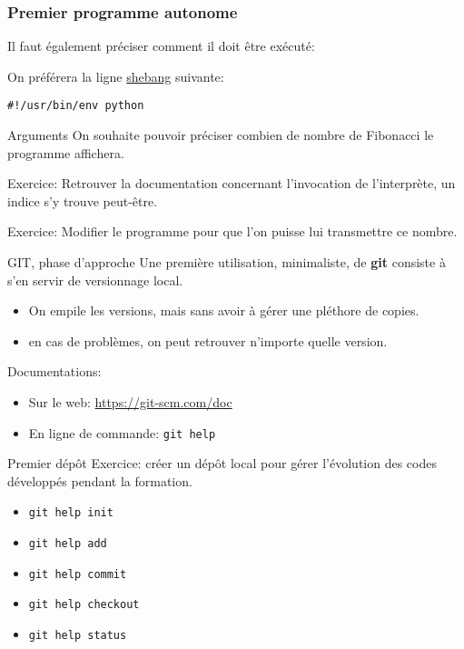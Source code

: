 \documentclass{beamer}
\begin{document}
\begin{frame}[fragile]\frametitle{Premier programme autonome}
  Il faut également préciser comment il doit être exécuté:
  \fbox{}

  On préférera la ligne \href{https://en.wikipedia.org/wiki/Shebang_(Unix)}{shebang} suivante:
\begin{verbatim}
#!/usr/bin/env python
\end{verbatim}
\end{frame}

\begin{frame}{Arguments}
  On souhaite pouvoir préciser combien de nombre de Fibonacci le programme affichera.

  Exercice: Retrouver la documentation concernant l'invocation de l'interprète, un indice s'y trouve peut-être.
  
  Exercice: Modifier le programme pour que l'on puisse lui transmettre ce nombre. 
\end{frame}

\begin{frame}{GIT, phase d'approche}
  Une première utilisation, minimaliste, de {\bf git} consiste à s'en servir de versionnage local.
  \begin{itemize}
  \item On empile les versions, mais sans avoir à gérer une pléthore de copies.
  \item en cas de problèmes, on peut retrouver n'importe quelle version.
  \end{itemize}
  Documentations:
  \begin{itemize}
  \item Sur le web: \url{https://git-scm.com/doc}
  \item En ligne de commande: {\tt git help}
  \end{itemize}
\end{frame}

\begin{frame}{Premier dépôt}
  Exercice: créer un dépôt local pour gérer l'évolution des codes développés pendant la formation.
  \begin{itemize}
  \item {\tt git help init}
  \item {\tt git help add}
  \item {\tt git help commit}
  \item {\tt git help checkout}
  \item {\tt git help status}
  \end{itemize}
\end{frame}
\end{document}
